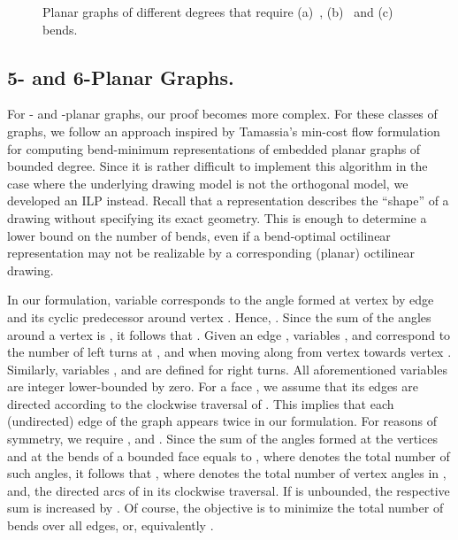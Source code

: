 \documentclass[a4paper,twoside,11pt]{article}
\begin{document}
\begin{figure}[t!]
    \centering
    \begin{minipage}[b]{.32\textwidth}
        \centering
    \end{minipage}
    \begin{minipage}[b]{.32\textwidth}
        \centering
    \end{minipage} 
    \begin{minipage}[b]{.32\textwidth}
        \centering
    \end{minipage}
    \caption{
    Planar graphs of different degrees that require
    (a)~, (b)~ and (c)~ bends.} 
    \label{fig:lower_bounds}
\end{figure}

\subsection{5- and 6-Planar Graphs.} 
\label{sec:56planarl}


For - and -planar graphs, our proof becomes more complex. For
these classes of graphs, we follow an approach inspired by Tamassia's
min-cost flow formulation~\cite{Tamassia87} for computing
bend-minimum representations of embedded planar graphs of bounded
degree. Since it is rather difficult to implement this algorithm in
the case where the underlying drawing model is not the orthogonal
model, we developed an ILP instead. Recall that a representation
describes the ``shape'' of a drawing without specifying its exact
geometry. This is enough to determine a lower bound on the number of
bends, even if a bend-optimal octilinear representation may not be
realizable by a corresponding (planar) octilinear drawing.

In our formulation, variable 
corresponds to the angle formed at vertex  by edge 
and its cyclic predecessor around vertex . Hence, . Since the sum of the angles around a vertex
is , it follows that .  Given an edge , variables ,
 and  correspond to the number of
left turns at ,  and  when moving
along  from vertex  towards vertex . Similarly,
variables ,  and  are
defined for right turns. All aforementioned variables are integer
lower-bounded by zero. For a face , we assume that
its edges are directed according to the clockwise traversal of .
This implies that each (undirected) edge of the graph appears twice
in our formulation.  For reasons of symmetry, we require
,  and
. Since the sum of the angles formed
at the vertices and at the bends of a bounded face  equals to
, where  denotes the total number of
such angles, it follows that , where 
denotes the total number of vertex angles in , and,  the
directed arcs of  in its clockwise traversal. If  is
unbounded, the respective sum is increased by . Of course, the
objective is to minimize the total number of bends over all edges,
or, equivalently .
\end{document}
